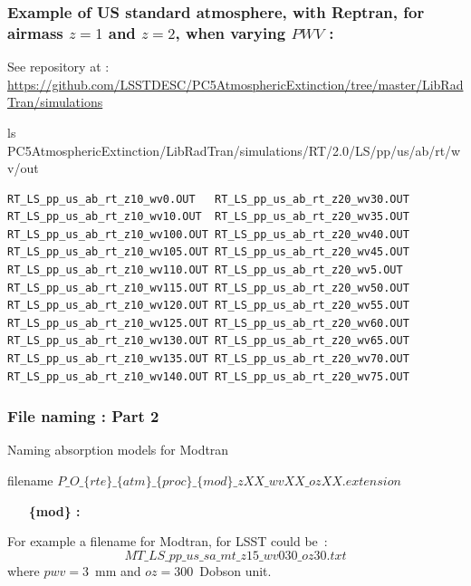 \documentclass{beamer}
\begin{document}
\begin{frame}[fragile]
\frametitle{Example of US standard atmosphere, with Reptran, for airmass $z=1$ and $z=2$, when varying $PWV$ :}
See repository at :
\href{https://github.com/LSSTDESC/PC5AtmosphericExtinction/tree/master/LibRadTran/simulations}{https://github.com/LSSTDESC/PC5AtmosphericExtinction/tree/master/LibRadTran/simulations}
\begin{block}{ls  PC5AtmosphericExtinction/LibRadTran/simulations/RT/2.0/LS/pp/us/ab/rt/wv/out}
{\scriptsize
\begin{verbatim}
RT_LS_pp_us_ab_rt_z10_wv0.OUT	RT_LS_pp_us_ab_rt_z20_wv30.OUT
RT_LS_pp_us_ab_rt_z10_wv10.OUT	RT_LS_pp_us_ab_rt_z20_wv35.OUT
RT_LS_pp_us_ab_rt_z10_wv100.OUT	RT_LS_pp_us_ab_rt_z20_wv40.OUT
RT_LS_pp_us_ab_rt_z10_wv105.OUT	RT_LS_pp_us_ab_rt_z20_wv45.OUT
RT_LS_pp_us_ab_rt_z10_wv110.OUT	RT_LS_pp_us_ab_rt_z20_wv5.OUT
RT_LS_pp_us_ab_rt_z10_wv115.OUT	RT_LS_pp_us_ab_rt_z20_wv50.OUT
RT_LS_pp_us_ab_rt_z10_wv120.OUT	RT_LS_pp_us_ab_rt_z20_wv55.OUT
RT_LS_pp_us_ab_rt_z10_wv125.OUT	RT_LS_pp_us_ab_rt_z20_wv60.OUT
RT_LS_pp_us_ab_rt_z10_wv130.OUT	RT_LS_pp_us_ab_rt_z20_wv65.OUT
RT_LS_pp_us_ab_rt_z10_wv135.OUT	RT_LS_pp_us_ab_rt_z20_wv70.OUT
RT_LS_pp_us_ab_rt_z10_wv140.OUT	RT_LS_pp_us_ab_rt_z20_wv75.OUT
\end{verbatim}
}
\end{block}
\end{frame}
\begin{frame}
\frametitle{File naming  : Part 2 }
Naming absorption models for Modtran
\begin{block}{filename}
$P\_O\_\{rte\}\_\{atm\}\_\{proc\}\_\{mod\}\_zXX\_wvXX\_ozXX.extension $ 
\end{block}
{\tiny
\begin{itemize}
\item [{\bf \{mod\} :}] 
{\tiny
{}
 }
\end{itemize}
For example a filename for Modtran, for LSST could be~:
\begin{equation}
MT\_LS\_pp\_us\_sa\_mt\_z15\_wv030\_oz30.txt  \nonumber
\end{equation}
where $pwv=3$~mm and $oz=300$~Dobson unit.
}
\end{frame}
\end{document}
